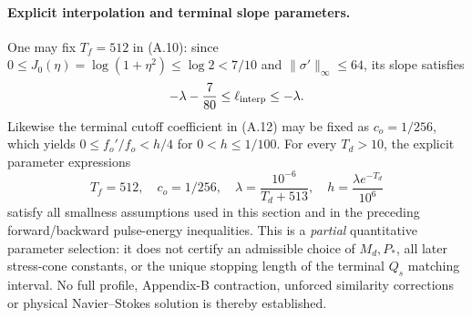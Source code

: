 \paragraph{Explicit interpolation and terminal slope parameters.}
One may fix $T_f=512$ in (A.10): since
$0\le J_0(\eta)=\log(1+\eta^2)\le\log2<7/10$
and $\|\sigma'\|_\infty\le64$, its slope satisfies
\begin{equation}\label{eq:A11-Tf-fixed}
 -\lambda-\frac7{80}\le\ell_{\rm interp}\le-\lambda.
\end{equation}
Likewise the terminal cutoff coefficient in (A.12) may be
fixed as $c_o=1/256$, which yields
$0\le f_o'/f_o<h/4$ for $0<h\le1/100$.
For every $T_d>10$, the explicit parameter expressions
\begin{equation}\label{eq:A11-partial-tuple}
 T_f=512,\quad c_o=1/256,\quad
 \lambda=\frac{10^{-6}}{T_d+513},\quad
 h=\frac{\lambda e^{-T_d}}{10^6}
\end{equation}
satisfy all smallness assumptions used in this section and
in the preceding forward/backward pulse-energy inequalities.
This is a \emph{partial} quantitative parameter selection:
it does not certify an admissible choice of $M_d,P_*$,
all later stress-cone constants, or the unique stopping length
of the terminal $Q_s$ matching interval. No full profile,
Appendix-B contraction, unforced similarity corrections or
physical Navier--Stokes solution is thereby established.
